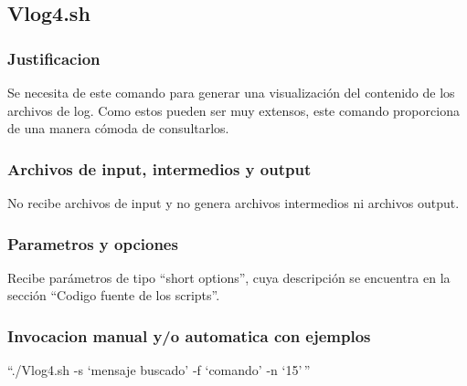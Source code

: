 \documentclass{article}
\begin{document}
	\subsection{Vlog4.sh}
	
		\subsubsection{Justificacion}
		Se necesita de este comando para generar una visualización del contenido de los archivos de log. Como estos pueden ser muy extensos, este comando proporciona de una manera cómoda de consultarlos.
		\subsubsection{Archivos de input, intermedios y output}
		No recibe archivos de input y no genera archivos intermedios ni archivos output.
		\subsubsection{Parametros y opciones}
		Recibe parámetros de tipo ``short options'', cuya descripción se encuentra en la sección ``Codigo fuente de los scripts''.
		\subsubsection{Invocacion manual y/o automatica con ejemplos}
		``./Vlog4.sh -s `mensaje buscado' -f `comando' -n `15'\,''
\end{document}
